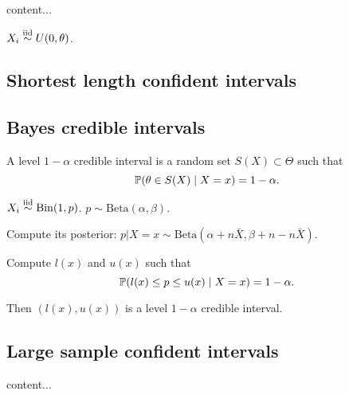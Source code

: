 \begin{exap}
	content...
\end{exap}

\begin{exap}
	$X_i \stackrel{\text{iid}}{\sim} U(0,\theta)$.
\end{exap}

\subsection{Shortest length confident intervals}

\subsection{Bayes credible intervals}
\begin{mydef}
	A level $1-\alpha$ credible interval is a random set $S(X)\subset \Theta$ such that
	$$\mathbb{P}(\theta \in S(X) \mid X = x) = 1 - \alpha.$$
\end{mydef}

\begin{exap}
	$X_i\stackrel{\text{iid}}{\sim} \mathrm{Bin}(1,p)$. $p \sim \mathrm{Beta}(\alpha,\beta)$.
	
	Compute its posterior: $p|X=x \sim \mathrm{Beta}( \alpha+ n\bar{X}, \beta + n - n\bar{X} )$.
	
	Compute $l(x)$ and $u(x)$ such that 
	$$\mathbb{P}( l(x) \leq p \leq u(x)\mid X=x ) = 1 - \alpha.$$	
	
	Then $(l(x), u(x))$ is a level $1-\alpha$ credible interval.
\end{exap}

\subsection{Large sample confident intervals}
\begin{exap}
	content...
\end{exap}

